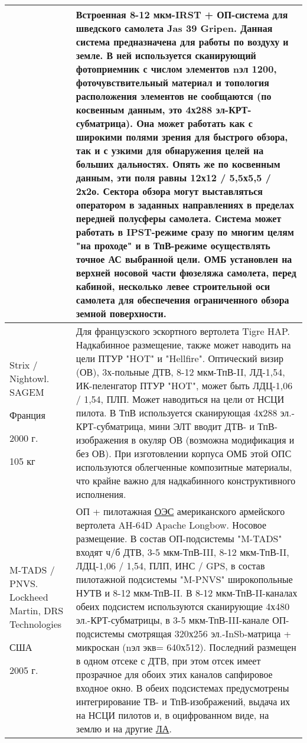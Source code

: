 \begin{landscape}
\begin{longtable}{| p{6cm} | p{18cm} |}
	& 
		Встроенная 8-12 мкм-IRST + ОП-система для шведского самолета Jas 39 Gripen. 
		Данная система предназначена для работы по воздуху и земле. В ней используется сканирующий фотоприемник с числом элементов nэл 1200, фоточувствительный материал и топология расположения элементов не сообщаются (по косвенным данным, это 4х288 эл-КРТ-субматрица). Она может работать как с широкими полями зрения для быстрого обзора, так и с узкими для обнаружения целей на больших дальностях. Опять же по косвенным данным, эти поля равны 12х12 / 5,5х5,5 / 2х2о. 
		Сектора обзора могут выставляться оператором в заданных направлениях в пределах передней полусферы самолета. Система может работать в IPST-режиме сразу по многим целям "на проходе" и в ТпВ-режиме осуществлять точное АС выбранной цели. 
		ОМБ установлен на верхней носовой части фюзеляжа самолета, перед кабиной, несколько левее строительной оси самолета для обеспечения ограниченного обзора земной поверхности. 
		 
	\\ \hline
		Strix / Nightowl. SAGEM	
		
		Франция	
		
		2000 г. 	
		
		105 кг 
	& 
		Для французского эскортного вертолета Tigre HAP. Надкабинное размещение, также может наводить на цели ПТУР "HOT" и "Hellfire". 
		Оптический визир (ОВ), 3х-польные ДТВ, 8-12 мкм-ТпВ-II, ЛД-1,54, ИК-пеленгатор ПТУР "HOT", 
		может быть ЛДЦ-1,06 / 1,54, ПЛП. Может наводиться на цели от НСЦИ пилота. В ТпВ используется сканирующая 4х288 эл.-КРТ-субматрица, мини ЭЛТ вводит ДТВ- и ТпВ-изображения в окуляр ОВ (возможна модификация и без ОВ). 
		При изготовлении корпуса ОМБ этой ОПС используются облегченные композитные материалы, что 
		крайне важно для надкабинного конструктивного исполнения.
		 
	\\ \hline
		M-TADS / PNVS. Lockheed Martin, DRS Technologies
		\cite[]{lockheedmartin}
		
		США	
		
		2005 г. 
		 
	& 
		ОП + пилотажная  \hyperref[acroEOS]{ОЭС} американского армейского вертолета AH-64D Apache Longbow. Носовое размещение. 
		В состав ОП-подсистемы "M-TADS" входят ч/б ДТВ, 3-5 мкм-ТпВ-III, 8-12 мкм-ТпВ-II, ЛДЦ-1,06 / 1,54, ПЛП, ИНС / GPS, в состав пилотажной подсистемы "M-PNVS" широкопольные НУТВ и 8-12 мкм-ТпВ-II. 
		В 8-12 мкм-ТпВ-II-каналах обеих подсистем используются сканирующие 4х480 эл.-КРТ-субматрицы, 
		в 3-5 мкм-ТпВ-III-канале ОП-подсистемы смотрящая 320х256 эл.-InSb-матрица + микроскан (nэл
		экв= 640х512). Последний размещен в одном отсеке с ДТВ, при этом отсек имеет прозрачное для обоих этих каналов сапфировое входное окно. 
		В обеих подсистемах предусмотрены интегрирование ТВ- и ТпВ-изображений, выдача их на НСЦИ 
		пилотов и, в оцифрованном виде, на землю и на другие  \hyperref[acroLA]{ЛА}.
		 

\end{longtable}
\end{landscape}
